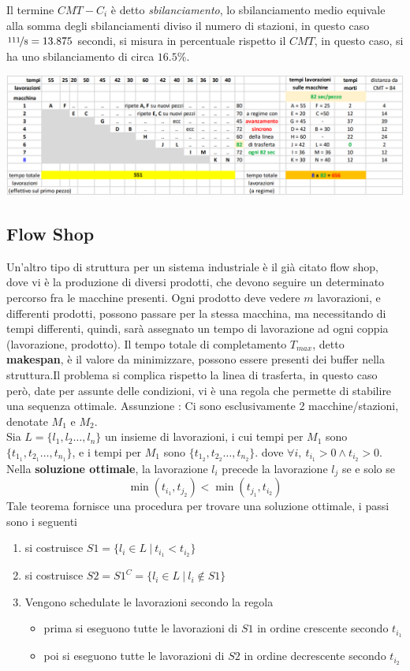 \documentclass[10pt, letterpaper]{report}
\begin{document}
Il termine $CMT-C_i$ è detto \textit{sbilanciamento}, lo sbilanciamento medio equivale  
alla somma degli sbilanciamenti diviso il numero di stazioni, in questo caso $\nicefrac{111}{8}=13.875$ secondi, 
si misura in percentuale rispetto il $CMT$, in questo caso, si ha uno sbilanciamento di circa $16.5\%$.
\begin{center}
    \includegraphics[width=1\textwidth ]{images/gantt.png}
\end{center}
\subsection{Flow Shop}
Un'altro tipo di struttura per un sistema industriale è il già citato flow shop, dove vi è la produzione 
di diversi prodotti, che devono seguire un determinato percorso fra le macchine presenti. Ogni prodotto 
deve vedere $m$ lavorazioni, e differenti prodotti, possono passare per la stessa macchina, ma 
necessitando di tempi differenti, quindi, sarà assegnato un tempo di lavorazione ad ogni 
coppia (lavorazione, prodotto). Il tempo totale di completamento $T_{max}$, detto \textbf{makespan}, è il 
valore da minimizzare, possono essere presenti dei buffer nella struttura.\acc Il problema si complica 
rispetto la linea di trasferta, in questo caso però, date per assunte delle condizioni, vi è una regola che permette 
di stabilire una sequenza ottimale.\acc 
{}
Assunzione : Ci sono esclusivamente 2 macchine/stazioni, denotate $M_1$ e $M_2$.\\
Sia $L=\{l_1,l_2\dots,l_n\}$ un insieme di lavorazioni, i  cui tempi per $M_1$ sono 
$\{t_{1_1},t_{2_1}\dots,t_{n_1}\}$, e i tempi per $M_1$ sono 
$\{t_{1_2},t_{2_2}\dots,t_{n_2}\}$. dove $\forall i, \ t_{i_1}>0\land t_{i_2}>0$. Nella \textbf{soluzione ottimale}, 
la lavorazione $l_i$ precede la lavorazione $l_j$ se e solo se 
$$ \min(t_{i_1},t_{j_2})<\min(t_{j_1},t_{i_2})$$
Tale teorema fornisce una procedura per trovare una soluzione ottimale, i passi sono i seguenti \begin{enumerate}
    \item si costruisce $S1=\{l_i\in L \ | \ t_{i_1}<t_{i_2}\}$
    \item si costruisce $S2=S1^C=\{l_i\in L \ | \ l_i\notin S1\}$
    \item Vengono schedulate le lavorazioni secondo la regola\begin{itemize}
        \item prima si eseguono tutte le lavorazioni di $S1$ in ordine crescente secondo $t_{i_1}$
        \item poi si eseguono tutte le lavorazioni di $S2$ in ordine decrescente secondo $t_{i_2}$
    \end{itemize}
\end{enumerate}
\end{document}
